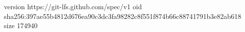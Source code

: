 version https://git-lfs.github.com/spec/v1
oid sha256:397ae55b4812d676ea90c3dc3fa98282c8f551f874b66c88741791b3e82ab618
size 174940

